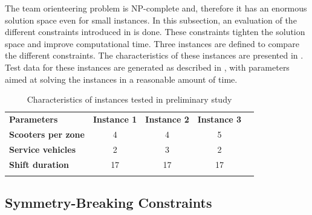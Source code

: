 The team orienteering problem is NP-complete \citep{golden_orienteering_1987} and, therefore it has an enormous solution space even for small instances. In this subsection, an evaluation of the different constraints introduced in  is done. These constraints tighten the solution space and improve computational time. Three instances are defined to compare the different constraints. The characteristics of these instances are presented in . Test data for these instances are generated as described in , with parameters aimed at solving the instances in a reasonable amount of time.
\\
\begin{table}[H]
    \centering
    \caption{Characteristics of instances tested in preliminary study}
    \begin{tabular}{l c c c c}
        \thickhline
        \textbf{Parameters} & \textbf{Instance 1} & \textbf{Instance 2}  & \textbf{Instance 3} \\
        \thickhline
        \textbf{Scooters per zone} & 4 & 4 & 5 \\
        \textbf{Service vehicles} & 2 & 3 & 2 \\
        \textbf{Shift duration} & 17 & 17 & 17 \\
        \thickhline
        \end{tabular}
    \label{computational_preliminary}
\end{table}


\subsection{Symmetry-Breaking Constraints}\label{prelim_sym_break}

